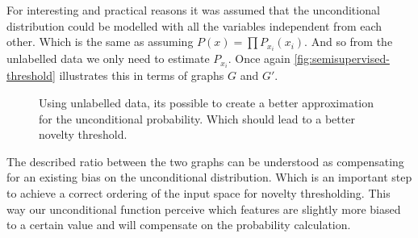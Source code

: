 \documentclass[runningheads,a4paper]{llncs}
\begin{document}
For interesting and practical reasons it was assumed that the unconditional distribution could be modelled with
all the variables independent from each other.
Which is the same as assuming $P(x)=\prod{P_{x_i}(x_i)}$.
And so from the unlabelled data we only need to estimate $P_{x_i}$.
Once again \autoref{fig:semisupervised-threshold} illustrates this in terms of graphs $G$ and $G'$.

\begin{figure}[h]
\centering
{}
\hfill
{}

\caption{\label{fig:semisupervised-threshold}Using unlabelled data, its possible to create a better approximation
         for the unconditional probability. Which should lead to a better novelty threshold.}
\end{figure}

The described ratio between the two graphs can be understood as compensating for an existing bias
on the unconditional distribution.
Which is an important step to achieve a correct ordering of the input space for novelty thresholding.
This way our unconditional function perceive which features are slightly more biased to a certain value and will
compensate on the probability calculation.
\end{document}
